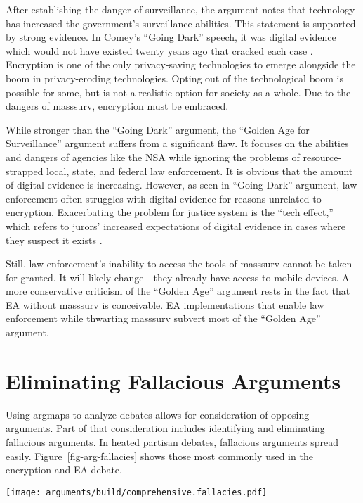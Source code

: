 \documentclass{IEEEtran}
\newcommand{\myfig}[1]{Figure~\ref{#1}}
\begin{document}
After establishing the danger of surveillance, the argument notes that technology has increased the government's
surveillance abilities. This statement is supported by strong evidence. In Comey's ``Going Dark'' speech, it was digital
evidence which would not have existed twenty years ago that cracked each case \cite{comey_2014}. Encryption is one of
the only privacy-saving technologies to emerge alongside the boom in privacy-eroding technologies. Opting out of the
technological boom is possible for some, but is not a realistic option for society as a whole. Due to the dangers of
\ac{masssurv}, \ac{encryption} must be embraced.

While stronger than the ``Going Dark'' argument, the ``Golden Age for Surveillance'' argument suffers from a significant
flaw. It focuses on the abilities and dangers of agencies like the \ac{NSA} while ignoring the problems of
resource-strapped local, state, and federal law enforcement. It is obvious that the amount of digital evidence is
increasing. However, as seen in ``Going Dark'' argument, law enforcement often struggles with digital evidence for
reasons unrelated to encryption. Exacerbating the problem for justice system is the ``tech effect,'' which refers to
jurors' increased expectations of digital evidence in cases where they suspect it exists \cite{shelton_study_2006}.

Still, law enforcement's inability to access the tools of \ac{masssurv} cannot be taken for granted. It will likely
change---they already have access to mobile devices. A more conservative criticism of the ``Golden Age'' argument rests
in the fact that \ac{EA} without \ac{masssurv} is conceivable. \ac{EA} implementations that enable law enforcement while
thwarting \ac{masssurv} subvert most of the ``Golden Age'' argument. 

\section{Eliminating Fallacious Arguments}

Using \acp{argmap} to analyze debates allows for consideration of opposing arguments. Part of that consideration
includes identifying and eliminating fallacious arguments. In heated partisan debates, fallacious arguments spread
easily. \myfig{fig-arg-fallacies} shows those most commonly used in the encryption and \ac{EA} debate.

\begin{figure*}[t!]
  \centering
  \texttt{[image: arguments/build/comprehensive.fallacies.pdf]}
  \caption{Fallacious Arguments of the EA Debate}
  \label{fig-arg-fallacies}
\end{figure*}
\end{document}
